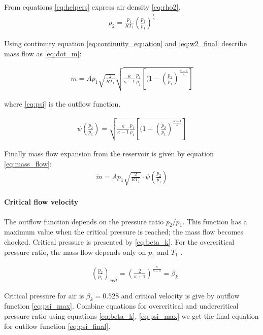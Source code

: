 From equations \ref{eq:helpers} express air density \ref{eq:rho2}.
\begin{align}
    \rho_2 = \frac{p_1}{RT_1} \left(\frac{p_2}{p_1}\right)^{\frac{1}{\kappa}}
    \label{eq:rho2}
\end{align}

Using continuity equation \ref{eq:continuity_equation} and
\ref{eq:w2_final} describe mass flow as \ref{eq:dot_m}:

\begin{align}
    \dot{m} = A p_1 \sqrt{\frac{2}{RT_1}}
    \sqrt{\frac{\kappa}{\kappa-1} \frac{p_1}{\rho_1} 
    \left[(1-\left(\frac{p_2}{p_1}\right)^\frac{\kappa-1}{\kappa}\right]}
    \label{eq:dot_m}
\end{align}

where \ref{eq:psi} is the outflow function.

\begin{align}
    \psi\left(\frac{p_2}{p_1}\right) =  
    \sqrt{\frac{\kappa}{\kappa-1} \frac{p_1}{\rho_1} 
    \left[(1-\left(\frac{p_2}{p_1}\right)^\frac{\kappa-1}{\kappa}\right]}
    \label{eq:psi}
\end{align}

Finally mass flow expansion from the reservoir is given by equation
\ref{eq:mass_flow}:
\begin{align}
    \dot{m} = A p_1\sqrt{\frac{2}{RT_1}} \cdot \psi\left(\frac{p_2}{p_1}\right)
    \label{eq:mass_flow}
\end{align}


\paragraph{Critical flow velocity}
The outflow function depends on the pressure ratio $p_2/p_1$. This function
has a maximum value when the critical pressure is reached; the mass flow
becomes chocked. Critical pressure is presented by \ref{eq:beta_k}. For the
overcritical pressure ratio, the mass flow depends only on $p_1$ and $T_1$
\cite{isermann}.

\begin{align}
    &\left(\frac{p_2}{p_1}\right)_{crit} =
    \left(\frac{2}{\kappa+1}\right)^\frac{\kappa}{\kappa-1}=\beta_k
    \label{eq:beta_k}
\end{align}

Critical pressure for air is $\beta_k = 0.528$ and critical velocity is
give by outflow function \ref{eq:psi_max}. Combine equations for
overcritical and undercritical pressure ratio using equations
\ref{eq:beta_k}, \ref{eq:psi_max} we get the final equation for outflow
function \ref{eq:psi_final}.

